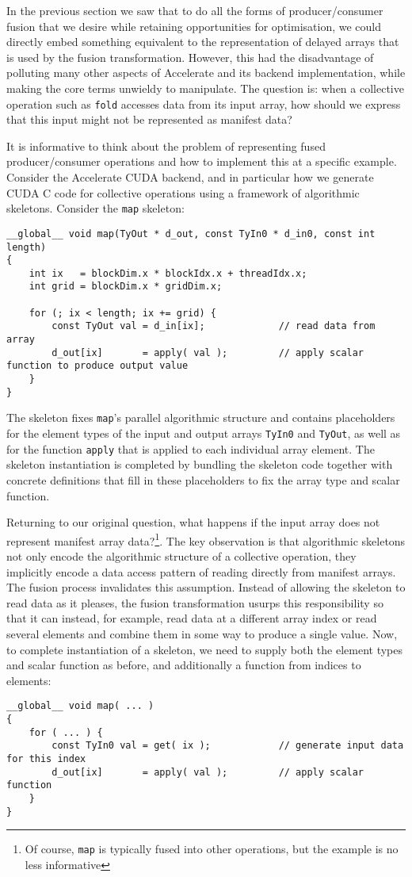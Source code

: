 In the previous section we saw that to do all the forms of producer/consumer
fusion that we desire while retaining opportunities for optimisation, we could
directly embed something equivalent to the representation of delayed arrays that
is used by the fusion transformation. However, this had the disadvantage of
polluting many other aspects of Accelerate and its backend implementation, while
making the core terms unwieldy to manipulate.
%
The question is: when a collective operation such as \texttt{fold} accesses data
from its input array, how should we express that this input might not be
represented as manifest data?

It is informative to think about the problem of representing fused
producer/consumer operations and how to implement this at a specific example.
Consider the Accelerate CUDA backend, and in particular how we generate CUDA C
code for collective operations using a framework of algorithmic skeletons.
Consider the \texttt{map} skeleton:
%
\begin{lstlisting}[style=cuda]
__global__ void map(TyOut * d_out, const TyIn0 * d_in0, const int length)
{
    int ix   = blockDim.x * blockIdx.x + threadIdx.x;
    int grid = blockDim.x * gridDim.x;

    for (; ix < length; ix += grid) {
        const TyOut val = d_in[ix];             // read data from array
        d_out[ix]       = apply( val );         // apply scalar function to produce output value
    }
}
\end{lstlisting}
%
The skeleton fixes \texttt{map}'s parallel algorithmic structure and contains
placeholders for the element types of the input and output arrays \texttt{TyIn0}
and \texttt{TyOut}, as well as for the function \texttt{apply} that is applied
to each individual array element. The skeleton instantiation is completed by
bundling the skeleton code together with concrete definitions that fill in these
placeholders to fix the array type and scalar function.

Returning to our original question, what happens if the input array does not
represent manifest array data?\footnote{Of course, \texttt{map} is typically
fused into other operations, but the example is no less informative}. The key
observation is that algorithmic skeletons not only encode the algorithmic
structure of a collective operation, they implicitly encode a data access
pattern of reading directly from manifest arrays. The fusion process invalidates
this assumption. Instead of allowing the skeleton to read data as it pleases,
the fusion transformation usurps this responsibility so that it can instead, for
example, read data at a different array index or read several elements and
combine them in some way to produce a single value. Now, to complete
instantiation of a skeleton, we need to supply both the element types and scalar
function as before, and additionally a function from indices to elements:
%
\begin{lstlisting}[style=cuda]
__global__ void map( ... )
{
    for ( ... ) {
        const TyIn0 val = get( ix );            // generate input data for this index
        d_out[ix]       = apply( val );         // apply scalar function
    }
}
\end{lstlisting}

